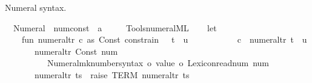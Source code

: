\begin{isabellebody}
%
\begin{isamarkuptext}%
Numeral syntax.%
\end{isamarkuptext}\isamarkuptrue%
\isamarkupfalse%
\isanewline
\ \ {\isachardoublequoteopen}{\isacharunderscore}{\kern0pt}Numeral{\isachardoublequoteclose}\ {\isacharcolon}{\kern0pt}{\isacharcolon}{\kern0pt}\ {\isachardoublequoteopen}num{\isacharunderscore}{\kern0pt}const\ {\isasymRightarrow}\ {\isacharprime}{\kern0pt}a{\isachardoublequoteclose}\ \ \ \ {\isacharparenleft}{\kern0pt}{\isachardoublequoteopen}{\isacharunderscore}{\kern0pt}{\isachardoublequoteclose}{\isacharparenright}{\kern0pt}\isanewline
%
\isadelimML
\isanewline
%
\endisadelimML
%
\isatagML
{}\isamarkupfalse%
\ {\isacartoucheopen}Tools{\isacharslash}{\kern0pt}numeral{\isachardot}{\kern0pt}ML{\isacartoucheclose}\isanewline
\isanewline
{}\isamarkupfalse%
\ {\isacartoucheopen}\isanewline
\ \ let\isanewline
\ \ \ \ fun\ numeral{\isacharunderscore}{\kern0pt}tr\ {\isacharbrackleft}{\kern0pt}{\isacharparenleft}{\kern0pt}c\ as\ Const\ {\isacharparenleft}{\kern0pt}\isactrlsyntaxUNDERSCOREconst {\isasymopen}{\isacharunderscore}{\kern0pt}constrain{\isasymclose}{\isacharcomma}{\kern0pt}\ {\isacharunderscore}{\kern0pt}{\isacharparenright}{\kern0pt}{\isacharparenright}{\kern0pt}\ {\isachardollar}{\kern0pt}\ t\ {\isachardollar}{\kern0pt}\ u{\isacharbrackright}{\kern0pt}\ {\isacharequal}{\kern0pt}\isanewline
\ \ \ \ \ \ \ \ \ \ c\ {\isachardollar}{\kern0pt}\ numeral{\isacharunderscore}{\kern0pt}tr\ {\isacharbrackleft}{\kern0pt}t{\isacharbrackright}{\kern0pt}\ {\isachardollar}{\kern0pt}\ u\isanewline
\ \ \ \ \ \ {\isacharbar}{\kern0pt}\ numeral{\isacharunderscore}{\kern0pt}tr\ {\isacharbrackleft}{\kern0pt}Const\ {\isacharparenleft}{\kern0pt}num{\isacharcomma}{\kern0pt}\ {\isacharunderscore}{\kern0pt}{\isacharparenright}{\kern0pt}{\isacharbrackright}{\kern0pt}\ {\isacharequal}{\kern0pt}\isanewline
\ \ \ \ \ \ \ \ \ \ {\isacharparenleft}{\kern0pt}Numeral{\isachardot}{\kern0pt}mk{\isacharunderscore}{\kern0pt}number{\isacharunderscore}{\kern0pt}syntax\ o\ {\isacharhash}{\kern0pt}value\ o\ Lexicon{\isachardot}{\kern0pt}read{\isacharunderscore}{\kern0pt}num{\isacharparenright}{\kern0pt}\ num\isanewline
\ \ \ \ \ \ {\isacharbar}{\kern0pt}\ numeral{\isacharunderscore}{\kern0pt}tr\ ts\ {\isacharequal}{\kern0pt}\ raise\ TERM\ {\isacharparenleft}{\kern0pt}{\isachardoublequote}{\kern0pt}numeral{\isacharunderscore}{\kern0pt}tr{\isachardoublequote}{\kern0pt}{\isacharcomma}{\kern0pt}\ ts{\isacharparenright}{\kern0pt}{\isacharsemicolon}{\kern0pt}\isanewline

\end{isabellebody}
